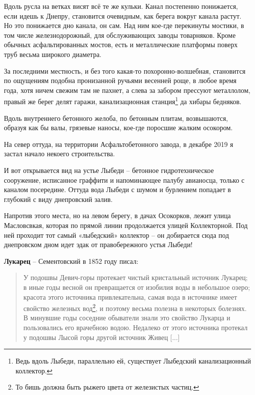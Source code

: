 Вдоль русла на ветках висят всё те же кульки. Канал постепенно понижается, если идешь к Днепру, становится очевидным, как берега вокруг канала растут. Но это понижается дно канала, он сам. Над ним кое-где перекинуты мостики, в том числе железнодорожный, для обслуживающих заводы товарняков. Кроме обычных асфальтированных мостов, есть и металлические платформы поверх труб весьма широкого диаметра.

За последними местность, и без того какая-то похоронно-волшебная, становится по ощущениям подобна пронизанной ручьями весенней роще, в любое время года, хотя ничем свежим там не пахнет, а слева за забором прессуют металлолом, правый же берег делят гаражи, канализационная станция\footnote{Ведь вдоль Лыбеди, параллельно ей, существует Лыбедский канализационный коллектор.} да хибары бедняков.

Вдоль внутреннего бетонного желоба, по бетонным плитам, возвышаются, образуя как бы валы, грязевые наносы, кое-где поросшие жалким осокором.

На север оттуда, на территории Асфальтобетонного завода, в декабре 2019 я застал начало некоего строительства.

И вот открывается вид на устье Лыбеди – бетонное гидротехническое сооружение, исписанное граффити и напоминающее палубу авианосца, только с каналом посередине. Оттуда вода Лыбеди с шумом и бурлением попадает в глубокий с виду днепровский залив.

Напротив этого места, но на левом берегу, в дачах Осокорков, лежит улица Масловсвкая, которая по прямой линии продолжается улицей Коллекторной. Под ней проходит тот самый «лыбедский» коллектор – он добирается сюда под днепровском дном идет эдак от правобережного устья Лыбеди!\\

\medskip

\textbf{Лукарец} – Сементовский в 1852 году писал:

\begin{quotation}
У подошвы Девич-горы протекает чистый кристальный источник Лукарец; в иные годы весной он превращается от изобилия воды в небольшое озеро; красота этого источника привлекательна, самая вода в источнике имеет свойство железных вод\footnote{То бишь должна быть рыжего цвета от железистых частиц.}, и поэтому весьма полезна в некоторых болезнях. В минувшие годы соседние обыватели знали это свойство Лукарца и пользовались его врачебною водою. Недалеко от этого источника протекал у подошвы Лысой горы другой источник Живец [...]
\end{quotation}

